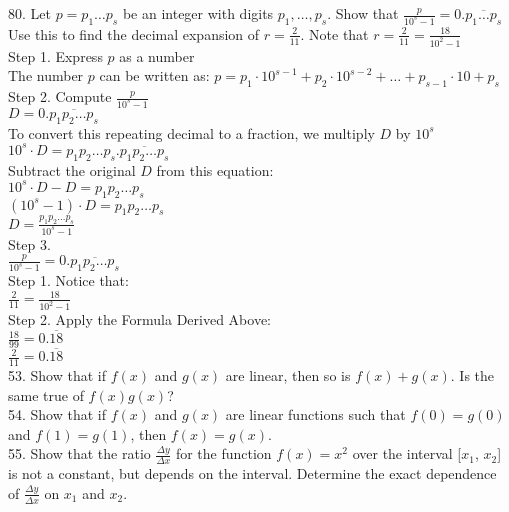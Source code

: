\documentclass{article}
\begin{document}
80. Let $p = p_1 \dots p_s$ be an integer with digits $p_1, \dots, p_s$. Show that $\frac{p}{10^s - 1} = 0.\overline{p_1 \dots p_s}$ Use this to find the decimal expansion of $r = \frac{2}{11}$. Note that $r = \frac{2}{11} = \frac{18}{10^2 - 1}$\\

Step 1. Express $p$ as a number\\
The number $p$ can be written as: $p = p_1 \cdot 10^{s-1} + p_2 \cdot 10^{s-2} + \dots + p_{s-1} \cdot 10 + p_s$\\

Step 2. Compute $\frac{p}{10^{s}-1}$\\
$D = 0.\overline{p_1p_2\dots p_s}$\\
To convert this repeating decimal to a fraction, we multiply $D$ by $10^s$\\
$10^s \cdot D = p_1p_2\dots p_s.\overline{p_1p_2\dots p_s}$\\
Subtract the original $D$ from this equation:\\
$10^s \cdot D - D = p_1p_2\dots p_s$\\
$(10^s - 1) \cdot D = p_1p_2\dots p_s$\\
$D = \frac{p_1p_2\dots p_s}{10^s - 1}$\\

Step 3.\\
$\frac{p}{10^s - 1} = 0.\overline{p_1p_2\dots p_s}$\\

Step 1. Notice that:\\
$\frac{2}{11} = \frac{18}{10^{2} - 1}$\\

Step 2. Apply the Formula Derived Above:\\
$\frac{18}{99} = 0.\overline{18}$\\
$\frac{2}{11} = 0.\overline{18}$\\

53. Show that if $f(x)$ and $g(x)$ are linear, then so is $f(x) + g(x)$. Is the same true of $f(x)g(x)$?\\

54. Show that if $f(x)$ and $g(x)$ are linear functions such that $f(0) = g(0)$ and $f(1) = g(1)$, then $f(x) = g(x)$.\\

55. Show that the ratio $\frac{\Delta y}{\Delta x}$ for the function $f(x) = x^2$ over the interval [$x_1$, $x_2$] is not a constant, but depends on the interval. Determine the exact dependence of $\frac{\Delta y}{\Delta x}$ on $x_1$ and $x_2$.\\
\end{document}
